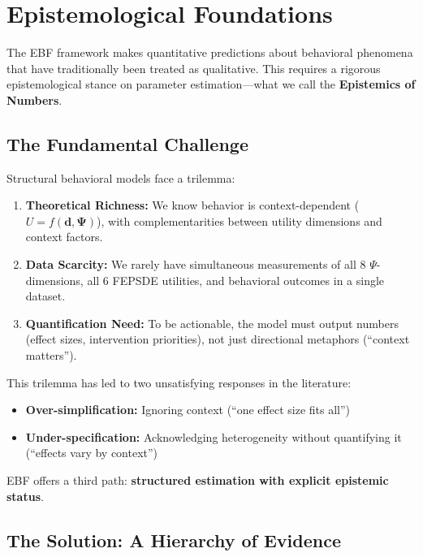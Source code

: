 \documentclass[11pt,a4paper]{article}
\theoremstyle{definition}
\begin{document}
\section{Epistemological Foundations}
\label{sec:bbb-epistemology}

The EBF framework makes quantitative predictions about behavioral phenomena 
that have traditionally been treated as qualitative. This requires a rigorous 
epistemological stance on parameter estimation---what we call the 
\textbf{Epistemics of Numbers}.

\subsection{The Fundamental Challenge}

Structural behavioral models face a trilemma:

\begin{enumerate}
    \item \textbf{Theoretical Richness:} We know behavior is context-dependent 
    ($U = f(\mathbf{d}, \boldsymbol{\Psi})$), with complementarities between 
    utility dimensions and context factors.
    
    \item \textbf{Data Scarcity:} We rarely have simultaneous measurements of all 
    8 $\Psi$-dimensions, all 6 FEPSDE utilities, and behavioral outcomes in a 
    single dataset.
    
    \item \textbf{Quantification Need:} To be actionable, the model must output 
    numbers (effect sizes, intervention priorities), not just directional 
    metaphors (``context matters'').
\end{enumerate}

This trilemma has led to two unsatisfying responses in the literature:
\begin{itemize}
    \item \textbf{Over-simplification:} Ignoring context (``one effect size fits all'')
    \item \textbf{Under-specification:} Acknowledging heterogeneity without 
    quantifying it (``effects vary by context'')
\end{itemize}

EBF offers a third path: \textbf{structured estimation with explicit 
epistemic status}.

\subsection{The Solution: A Hierarchy of Evidence}
\end{document}

